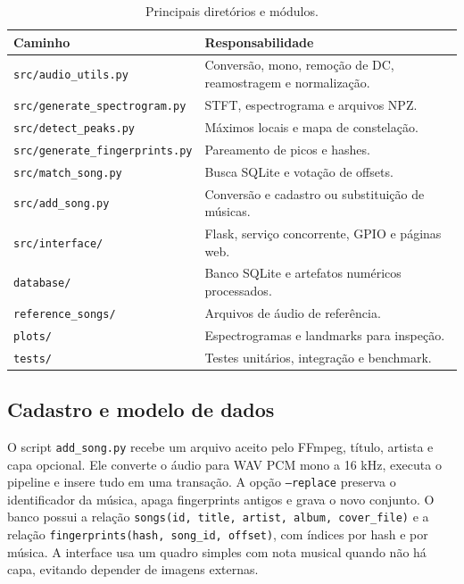 \documentclass[12pt,a4paper]{article}
\newcommand{\codigo}[1]{\texttt{#1}}
\newcommand{\caminho}[1]{\nolinkurl{#1}}
\begin{document}
\begin{table}[H]
    \centering
    \caption{Principais diretórios e módulos.}
    \label{tab:modulos}
    \small
    \begin{tabularx}{\textwidth}{p{4.7cm} Y}
        \toprule
        \textbf{Caminho} & \textbf{Responsabilidade}\\
        \midrule
        \caminho{src/audio_utils.py} & Conversão, mono, remoção de DC,
        reamostragem e normalização.\\
        \caminho{src/generate_spectrogram.py} & STFT, espectrograma e arquivos NPZ.\\
        \caminho{src/detect_peaks.py} & Máximos locais e mapa de constelação.\\
        \caminho{src/generate_fingerprints.py} & Pareamento de picos e hashes.\\
        \caminho{src/match_song.py} & Busca SQLite e votação de offsets.\\
        \caminho{src/add_song.py} & Conversão e cadastro ou substituição de músicas.\\
        \caminho{src/interface/} & Flask, serviço concorrente, GPIO e páginas web.\\
        \caminho{database/} & Banco SQLite e artefatos numéricos processados.\\
        \caminho{reference_songs/} & Arquivos de áudio de referência.\\
        \caminho{plots/} & Espectrogramas e landmarks para inspeção.\\
        \caminho{tests/} & Testes unitários, integração e benchmark.\\
        \bottomrule
    \end{tabularx}
\end{table}

\subsection{Cadastro e modelo de dados}

O script \codigo{add\_song.py} recebe um arquivo aceito pelo FFmpeg, título,
artista e capa opcional. Ele converte o áudio para WAV PCM mono a 16 kHz, executa
o pipeline e insere tudo em uma transação. A opção \codigo{--replace} preserva o
identificador da música, apaga fingerprints antigos e grava o novo conjunto. O
banco possui a relação \codigo{songs(id, title, artist, album, cover\_file)} e a
relação \codigo{fingerprints(hash, song\_id, offset)}, com índices por hash e por
música. A interface usa um quadro simples com nota musical quando não há capa,
evitando depender de imagens externas.
\end{document}
